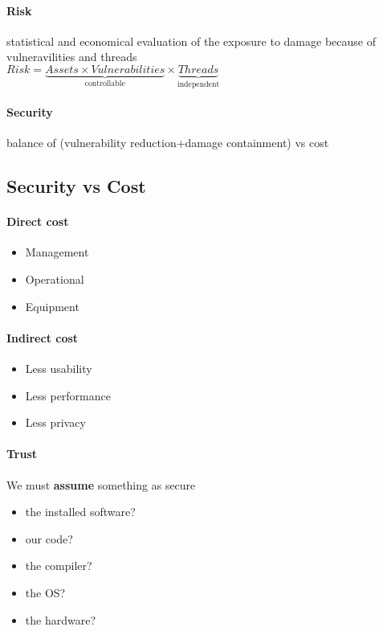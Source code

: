 \documentclass{article}
\begin{document}
\paragraph{Risk} statistical and economical evaluation of the exposure to damage because of vulneravilities and threads\\
$Risk = \underbrace{Assets \times Vulnerabilities}_\text{controllable} \times \underbrace{Threads}_\text{independent}$
\paragraph{Security} balance of (vulnerability reduction+damage containment) vs cost

\subsection{Security vs Cost} 

\paragraph{Direct cost}
\begin{itemize}
\item Management
\item Operational
\item Equipment
\end{itemize}

\paragraph{Indirect cost}
\begin{itemize}
\item Less usability
\item Less performance
\item Less privacy
\end{itemize}

\paragraph{Trust} We must \textbf{assume} something as secure
\begin{itemize}
\item the installed software?
\item our code?
\item the compiler?
\item the OS?
\item the hardware?
\end{itemize}
\end{document}
